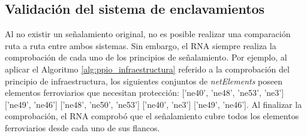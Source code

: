 \subsection{Validación del sistema de enclavamientos}

    Al no existir un señalamiento original, no es posible realizar una comparación ruta a ruta entre ambos sistemas. Sin embargo, el RNA siempre realiza la comprobación de cada uno de los principios de señalamiento. Por ejemplo, al aplicar el Algoritmo \ref{alg:ppio_infraestructura} referido a la comprobación del principio de infraestructura, los siguientes conjuntos de \textit{netElements} poseen elementos ferroviarios que necesitan protección: ['ne40', 'ne48', 'ne53', 'ne3'] ['ne49', 'ne46'] ['ne48', 'ne50', 'ne53'] ['ne40', 'ne3'] ['ne49', 'ne46']. Al finalizar la comprobación, el RNA comprobó que el señalamiento cubre todos los elementos ferroviarios desde cada uno de sus flancos. 